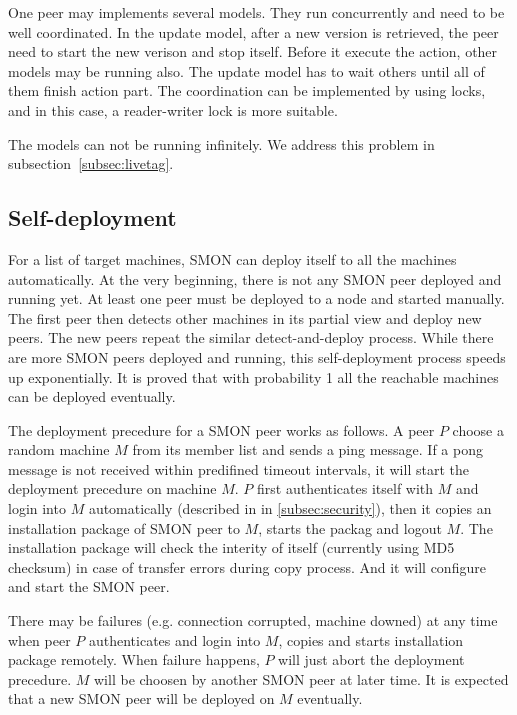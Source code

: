 One peer may implements several models. They run
concurrently and need to be well coordinated. In the update
model, after a new version is retrieved, the peer need to
start the new verison and stop itself. Before it execute the
action, other models may be running also. The update model
has to wait others until all of them finish action part.
The coordination can be implemented by using locks, and in
this case, a reader-writer lock is more suitable.

The models can not be running infinitely. We address this
problem in subsection~\ref{subsec:livetag}.

\subsection{Self-deployment}

For a list of target machines, SMON can deploy itself to all
the machines automatically. At the very beginning, there is
not any SMON peer deployed and running yet. At least one
peer must be deployed to a node and started manually.  The
first peer then detects other machines in its partial view
and deploy new peers. The new peers repeat the similar
detect-and-deploy process. While there are more SMON peers
deployed and running, this self-deployment process speeds up
exponentially. It is proved that with probability 1 all the
reachable machines can be deployed
eventually\cite{Eugster2004}.

The deployment precedure for a SMON peer works as follows.
A peer $P$ choose a random machine $M$ from its member list
and sends a ping message. If a pong message is not received
within predifined timeout intervals, it will start the
deployment precedure on machine $M$. $P$ first authenticates
itself with $M$ and login into $M$ automatically (described
in in \ref{subsec:security}), then it copies an installation
package of SMON peer to $M$, starts the packag and logout
$M$. The installation package will check the interity of
itself (currently using MD5 checksum) in case of transfer
errors during copy process. And it will configure and start
the SMON peer.

There may be failures (e.g. connection corrupted, machine
downed) at any time when peer $P$ authenticates and login
into $M$, copies and starts installation package remotely.
When failure happens, $P$ will just abort the deployment
precedure. $M$ will be choosen by another SMON peer at later
time. It is expected that a new SMON peer will be deployed
on $M$ eventually.

